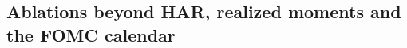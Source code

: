 \subsection{Ablations beyond HAR, realized moments and the FOMC calendar}
\label{app:rh_results_beyond}
